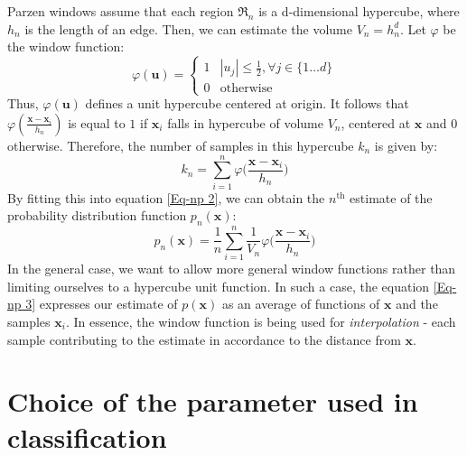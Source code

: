 Parzen windows assume that each region $\mathfrak{R}_n$ is a d-dimensional hypercube, where $h_n$ is the length of an edge. Then, we can estimate the volume $V_n = h_n^d$. Let $\varphi$ be the window function:
\begin{equation}
\varphi(\mathbf{u}) = \begin{cases}
1 & |u_j| \leq \frac{1}{2}, \forall j \in \{1\dots d\} \\
0 & \text{otherwise}
\end{cases}
\end{equation}
Thus, $\varphi(\mathbf{u})$ defines a unit hypercube centered at origin. It follows that $\varphi(\frac{\mathbf{x} - \mathbf{x}_i}{h_n})$ is equal to $1$ if $\mathbf{x}_i$ falls in hypercube of volume $V_n$, centered at $\mathbf{x}$ and $0$ otherwise. Therefore, the number of samples in this hypercube $k_n$ is given by:
\begin{equation}
k_n = \sum_{i=1}^{n} \varphi \bigg(\frac{\mathbf{x} - \mathbf{x}_i}{h_n}\bigg)
\end{equation}
By fitting this into equation \ref{Eq-np 2}, we can obtain the $n^{\text{th}}$ estimate of the probability distribution function $p_n(\mathbf{x})$: 
\begin{equation}
p_n(\mathbf{x}) = \frac{1}{n} \sum_{i=1}^{n} \frac{1}{V_n} \varphi \bigg( \frac{\mathbf{x} - \mathbf{x}_i}{h_n} \bigg)
\label{Eq-np 3}
\end{equation} 
In the general case, we want to allow more general window functions rather than limiting ourselves to a hypercube unit function. In such a case, the equation \ref{Eq-np 3} expresses our estimate of $p(\mathbf{x})$ as an average of functions of $\mathbf{x}$ and the samples $\mathbf{x}_i$. In essence, the window function is being used for \textit{interpolation} - each sample contributing to the estimate in accordance to the distance from $\mathbf{x}$.

\section{Choice of the parameter used in classification} \label{Section: appendix/pnn/parameter}

